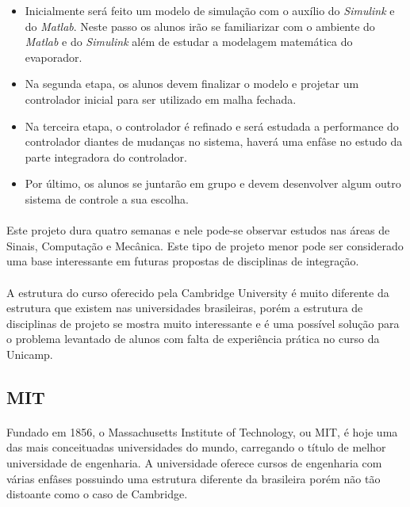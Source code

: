\documentclass[12pt]{article} %
\begin{document}
\begin{itemize}
\item Inicialmente será feito um modelo de simulação com o auxílio do \textit{Simulink} e do \textit{Matlab}. Neste passo os alunos irão se familiarizar com o ambiente do \textit{Matlab} e do \textit{Simulink} além de estudar a modelagem matemática do evaporador.
\item Na segunda etapa, os alunos devem finalizar o modelo e projetar um controlador inicial para ser utilizado em malha fechada.
\item Na terceira etapa, o controlador é refinado e será estudada a performance do controlador diantes de mudanças no sistema, haverá uma enfâse no estudo da parte integradora do controlador.
\item Por último, os alunos se juntarão em grupo e devem desenvolver algum outro sistema de controle a sua escolha.
\end{itemize}

\paragraph{} Este projeto dura quatro semanas e nele pode-se observar estudos nas áreas de Sinais, Computação e Mecânica. Este tipo de projeto menor pode ser considerado uma base interessante em futuras propostas de disciplinas de integração.

\paragraph{} A estrutura do curso oferecido pela Cambridge University é muito diferente da estrutura que existem nas universidades brasileiras, porém a estrutura de disciplinas de projeto se mostra muito interessante e é uma possível solução para o problema levantado de alunos
com falta de experiência prática no curso da Unicamp.


\subsection{MIT}

\paragraph{} Fundado em 1856, o Massachusetts Institute of Technology, ou MIT, é hoje uma das mais conceituadas universidades do mundo, carregando o título de melhor universidade de engenharia. A universidade oferece cursos de engenharia com várias enfâses possuindo uma estrutura
diferente da brasileira porém não tão distoante como o caso de Cambridge.
\end{document}
